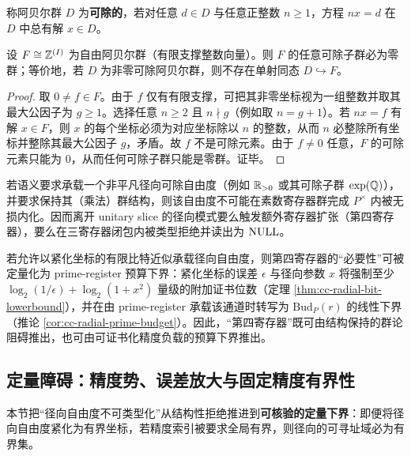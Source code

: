 \begin{definition}[可除阿贝尔群]\label{def:divisible-group}
称阿贝尔群 $D$ 为\textbf{可除的}，若对任意 $d\in D$ 与任意正整数 $n\ge 1$，方程 $nx=d$ 在 $D$ 中总有解 $x\in D$。
\end{definition}

\begin{theorem}[自由阿贝尔群无非零可除子群]\label{thm:free-abelian-no-divisible}
设 $F\cong \mathbb{Z}^{(I)}$ 为自由阿贝尔群（有限支撑整数向量）。则 $F$ 的任意可除子群必为零群；等价地，若 $D$ 为非零可除阿贝尔群，则不存在单射同态 $D\hookrightarrow F$。
\end{theorem}

\begin{proof}
取 $0\neq f\in F$。由于 $f$ 仅有有限支撑，可把其非零坐标视为一组整数并取其最大公因子为 $g\ge 1$。选择任意 $n\ge 2$ 且 $n\nmid g$（例如取 $n=g+1$）。若 $nx=f$ 有解 $x\in F$，则 $x$ 的每个坐标必须为对应坐标除以 $n$ 的整数，从而 $n$ 必整除所有坐标并整除其最大公因子 $g$，矛盾。故 $f$ 不是可除元素。由于 $f\neq 0$ 任意，$F$ 的可除元素只能为 $0$，从而任何可除子群只能是零群。证毕。
\end{proof}

\begin{corollary}[第四寄存器的代数必然性]\label{cor:fourth-register-divisible}
若语义要求承载一个非平凡径向可除自由度（例如 $\mathbb{R}_{>0}$ 或其可除子群 $\exp(\mathbb{Q})$），并要求保持其（乘法）群结构，则该自由度不可能在素数寄存器群完成 $P^\times$ 内被无损内化。因而离开 unitary slice 的径向模式要么触发额外寄存器扩张（第四寄存器），要么在三寄存器闭包内被类型拒绝并读出为 $\mathrm{NULL}$。
\end{corollary}

\begin{remark}[与预算下界的对应]\label{rem:fourth-register-budget-link}
若允许以紧化坐标的有限比特近似承载径向自由度，则第四寄存器的“必要性”可被定量化为 prime-register 预算下界：紧化坐标的误差 $\epsilon$ 与径向参数 $x$ 将强制至少
$
\log_2(1/\epsilon)+\log_2(1+x^2)
$
量级的附加证书位数（定理 \ref{thm:cc-radial-bit-lowerbound}），并在由 prime-register 承载该通道时转写为 $\mathrm{Bud}_P(r)$ 的线性下界（推论 \ref{cor:cc-radial-prime-budget}）。因此，“第四寄存器”既可由结构保持的群论阻碍推出，也可由可证书化精度负载的预算下界推出。
\end{remark}

\subsection{定量障碍：精度势、误差放大与固定精度有界性}\label{subsec:fourth-register-quantitative}
本节把“径向自由度不可类型化”从结构性拒绝推进到\textbf{可核验的定量下界}：即便将径向自由度紧化为有界坐标，若精度索引被要求全局有界，则径向的可寻址域必为有界集。\par

